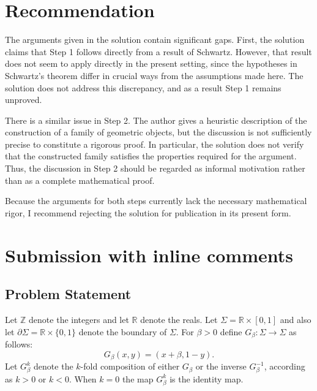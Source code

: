 \documentclass[12pt]{article}
\begin{document}
\section{Recommendation}

The arguments given in the solution contain significant gaps. First, the solution claims that Step 1 follows directly from a result of Schwartz. However, that result does not seem to apply directly in the present setting, since the hypotheses in Schwartz’s theorem differ in crucial ways from the assumptions made here. The solution does not address this discrepancy, and as a result Step 1 remains unproved.

There is a similar issue in Step 2. The author gives a heuristic description of the construction of a family of geometric objects, but the discussion is not sufficiently precise to constitute a rigorous proof. In particular, the solution does not verify that the constructed family satisfies the properties required for the argument. Thus, the discussion in Step 2 should be regarded as informal motivation rather than as a complete mathematical proof.

Because the arguments for both steps currently lack the necessary mathematical rigor, I recommend rejecting the solution for publication in its present form.


  \section{Submission with inline comments}


\date{}


\subsection*{Problem Statement}

Let $\mathbb{Z}$ denote the integers and let $\mathbb{R}$ denote the reals.
Let $\Sigma= \mathbb{R} \times [0,1]$ and also let $\partial \Sigma=\mathbb{R} \times \{0,1\}$ denote the boundary of $\Sigma$. 
For $\beta>0$ define $G_{\beta}: \Sigma \to \Sigma$ as follows:
\[
G_{\beta}(x,y)=(x+\beta,1-y).
\]
Let $G_{\beta}^k$ denote the $k$-fold composition of either $G_{\beta}$ or the inverse $G_{\beta}^{-1}$, according as $k>0$ or $k<0$. When $k=0$ the map $G_{\beta}^k$ is the identity map.
\end{document}
